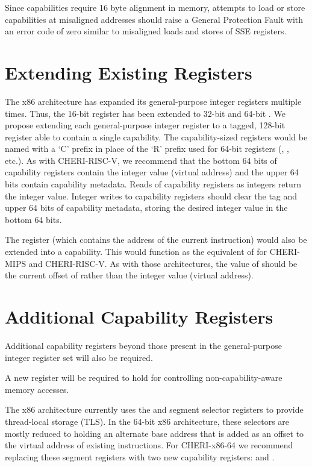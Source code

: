 Since capabilities require 16 byte alignment in memory, attempts to
load or store capabilities at misaligned addresses should raise a
General Protection Fault with an error code of zero similar to
misaligned loads and stores of SSE registers.

\section{Extending Existing Registers}

The x86 architecture has expanded its general-purpose integer registers multiple
times.  Thus, the 16-bit \AX{} register has been extended to 32-bit \EAX{}
and 64-bit \RAX{}.
We propose extending each general-purpose integer register to a tagged, 128-bit register
able to contain a single capability.
The capability-sized registers would be named with a `C' prefix in place
of the `R' prefix used for 64-bit registers
(\CAX{}, \CBX{}, etc.).
As with CHERI-RISC-V,
we recommend that the bottom 64 bits of capability registers contain
the integer value (virtual address) and the upper 64 bits contain
capability metadata.
Reads of capability registers as integers return the integer value.
Integer writes to capability registers
should clear the tag and upper 64 bits of capability metadata, storing the
desired integer value in the bottom 64 bits.

The \RIP{} register (which contains the address of the current instruction)
would also be extended into a \CIP{} capability.  This would function as
the equivalent of \PCC{} for CHERI-MIPS and CHERI-RISC-V.  As with
those architectures, the
value of \RIP{} should be the current offset of \CIP{} rather than the
integer value (virtual address).

\section{Additional Capability Registers}

Additional capability registers beyond those present in the general-purpose
integer
register set will also be required.

A new register will be required to hold \DDC{} for controlling
non-capability-aware memory accesses.

The x86 architecture currently uses the \FS{} and \GS{} segment selector registers
to provide thread-local storage (TLS).  In the 64-bit x86 architecture,
these selectors are mostly reduced to holding an alternate base address
that is added as an offset to the virtual address of existing instructions.
For CHERI-x86-64 we recommend replacing these segment registers with two
new capability registers: \CFS{} and \CGS{}.

